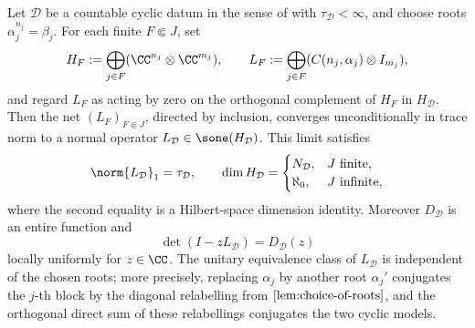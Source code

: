 \begin{proposition}
  \label{prop:cyclic-data-construction-interface}
  Let \(\mathcal D\) be a countable cyclic datum in the sense of
   with
  \(\tau_{\mathcal D}<\infty\), and choose roots
  \(\alpha_j^{n_j}=\beta_j\). For each finite
  \(F\Subset J\), set
  \[
    H_F:=\bigoplus_{j\in F}(\CC^{n_j}\otimes\CC^{m_j}),
    \qquad
    L_F:=\bigoplus_{j\in F}(C(n_j,\alpha_j)\otimes I_{m_j}),
  \]
  and regard \(L_F\) as acting by zero on the orthogonal complement of
  \(H_F\) in \(H_{\mathcal D}\). Then the net
  \((L_F)_{F\Subset J}\), directed by inclusion, converges
  unconditionally in trace norm to a normal operator
  \(L_{\mathcal D}\in\sone(H_{\mathcal D})\). This limit satisfies
  \[
    \norm{L_{\mathcal D}}_1=\tau_{\mathcal D},
    \qquad
    \dim H_{\mathcal D}=
    \begin{cases}
      N_{\mathcal D},& J\text{ finite},\\
      \aleph_0,& J\text{ infinite},
    \end{cases}
  \]
  where the second equality is a Hilbert-space dimension identity.
  Moreover \(D_{\mathcal D}\) is an entire function and
  \[
    \det(I-zL_{\mathcal D})=D_{\mathcal D}(z)
  \]
  locally uniformly for \(z\in\CC\). The unitary equivalence class of
  \(L_{\mathcal D}\) is independent of the chosen roots; more precisely,
  replacing \(\alpha_j\) by another root \(\alpha_j'\) conjugates the
  \(j\)-th block by the diagonal relabelling from
  \(\Cref{lem:choice-of-roots}\), and the orthogonal direct sum of these
  relabellings conjugates the two cyclic models.
\end{proposition}


